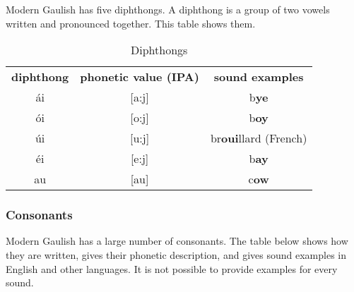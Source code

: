 Modern Gaulish has five diphthongs. A diphthong is a group of two vowels written and pronounced together. This table shows them.

\begin{table}[H]
\begin{center}
\begin{tabular}{ccc}
  \toprule
  \textbf{diphthong} & \textbf{phonetic value (IPA)} & \textbf{sound examples}\\
  \cmidrule(lr){1-1}\cmidrule(lr){2-2}\cmidrule(lr){3-3}
  \'{a}i & [a:j] & b\textbf{ye}\\
  \'{o}i & [o:j] & b\textbf{oy}\\
  \'{u}i & [u:j] & br\textbf{oui}llard (French)\\
  \'{e}i & [e:j] & b\textbf{ay}\\
  au & [au] & c\textbf{ow}\\
  \bottomrule
\end{tabular}
\end{center}
\caption{Diphthongs}
\label{phonology_diphthongs}
\end{table}

\subsubsection{Consonants}

Modern Gaulish has a large number of consonants. The table below shows how they are written, gives their phonetic description, and gives sound examples in English and other languages. It is not possible to provide examples for every sound.

